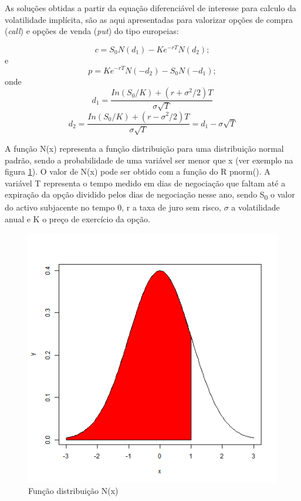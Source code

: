 \documentclass[
  12pt,
  a4paper,
  openany]{book}
\begin{document}
As soluções obtidas a partir da equação diferenciável de interesse para calculo da volatilidade implícita, são as aqui apresentadas para valorizar opções de compra (\emph{call}) e opções de venda (\emph{put}) do tipo europeias:

\begin{equation} 
  c = S_0N(d_1) - Ke^{-rT}N(d_2);
  \label{eq:call}
\end{equation}
e
\begin{equation} 
  p = Ke^{-rT}N(-d_2) - S_0N(-d_1);
  \label{eq:put}
\end{equation}
onde
\begin{equation} 
  d_1 = \frac{In(S_0/K)+(r+\sigma^2/2)T}{\sigma\sqrt{T}}
  \label{eq:d1}
\end{equation}
\begin{equation} 
  d_2 = \frac{In(S_0/K)+(r-\sigma^2/2)T}{\sigma\sqrt{T}}=d_1-\sigma\sqrt{T}
  \label{eq:d2}
\end{equation}

A função N(x) representa a função distribuição para uma distribuição normal padrão, sendo a probabilidade de uma variável ser menor que x (ver exemplo na figura \ref{fig:fdistribuicao}). O valor de N(x) pode ser obtido com a função do R pnorm(). A variável T representa o tempo medido em dias de negociação que faltam até a expiração da opção dividido pelos dias de negociação nesse ano, sendo S\textsubscript{0} o valor do activo subjacente no tempo 0, r a taxa de juro sem risco, \(\sigma\) a volatilidade anual e K o preço de exercício da opção.

\begin{figure}

{\centering \includegraphics[width=0.5\linewidth]{image/fdistribuicao} 

}

\caption{Função distribuição N(x)}\label{fig:fdistribuicao}
\end{figure}
\centering
\end{document}
